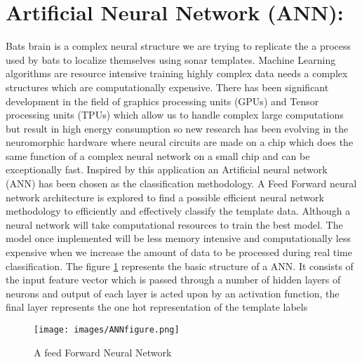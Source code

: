 \documentclass[11pt]{report}
\begin{document}
\section{Artificial Neural Network (ANN):}
Bats brain is a complex neural structure we are trying to replicate the a process used by bats to localize themselves using sonar templates. Machine Learning algorithms are resource intensive training highly complex data needs a complex structures which are computationally expensive. There has been significant development in the field of graphics processing units (GPUs) and Tensor processing units (TPUs) which allow us to handle complex large computations but result in high energy consumption so new research has been evolving in the neuromorphic hardware where neural circuits are made on a chip which does the same function of a complex neural network on a small chip and can be exceptionally fast. Inspired by this application an Artificial neural network (ANN) has been chosen as the classification methodology. A Feed Forward neural network architecture is explored to find a possible efficient neural network methodology to efficiently and effectively classify the template data. Although a neural network will take computational resources to train the best model. The model once implemented will be less memory intensive and computationally less expensive when we increase the amount of data to be processed during real time classification. The figure \ref{ANN} represents the basic structure of a ANN. It consists of the input feature vector which is passed through a number of hidden layers of neurons and output of each layer is acted upon by an activation function, the final layer represents the one hot representation of the template labels
\begin{figure}[ht]
	\texttt{[image: images/ANNfigure.png]}
	\caption{A feed Forward Neural Network}
	\label{ANN}
\end{figure}






\end{document}
